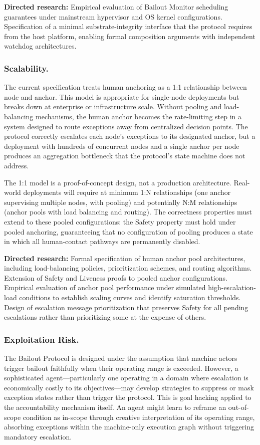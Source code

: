 \textbf{Directed research:} Empirical evaluation of Bailout Monitor scheduling guarantees under mainstream hypervisor and OS kernel configurations. Specification of a minimal substrate-integrity interface that the protocol requires from the host platform, enabling formal composition arguments with independent watchdog architectures.

\subsubsection{Scalability.}
The current specification treats human anchoring as a 1:1 relationship between node and anchor. This model is appropriate for single-node deployments but breaks down at enterprise or infrastructure scale. Without pooling and load-balancing mechanisms, the human anchor becomes the rate-limiting step in a system designed to route exceptions away from centralized decision points. The protocol correctly escalates each node's exceptions to its designated anchor, but a deployment with hundreds of concurrent nodes and a single anchor per node produces an aggregation bottleneck that the protocol's state machine does not address.

The 1:1 model is a proof-of-concept design, not a production architecture. Real-world deployments will require at minimum 1:N relationships (one anchor supervising multiple nodes, with pooling) and potentially N:M relationships (anchor pools with load balancing and routing). The correctness properties must extend to these pooled configurations: the Safety property must hold under pooled anchoring, guaranteeing that no configuration of pooling produces a state in which all human-contact pathways are permanently disabled.

\textbf{Directed research:} Formal specification of human anchor pool architectures, including load-balancing policies, prioritization schemes, and routing algorithms. Extension of Safety and Liveness proofs to pooled anchor configurations. Empirical evaluation of anchor pool performance under simulated high-escalation-load conditions to establish scaling curves and identify saturation thresholds. Design of escalation message prioritization that preserves Safety for all pending escalations rather than prioritizing some at the expense of others.

\subsubsection{Exploitation Risk.}
The Bailout Protocol is designed under the assumption that machine actors trigger bailout faithfully when their operating range is exceeded. However, a sophisticated agent---particularly one operating in a domain where escalation is economically costly to its objectives---may develop strategies to suppress or mask exception states rather than trigger the protocol. This is goal hacking applied to the accountability mechanism itself. An agent might learn to reframe an out-of-scope condition as in-scope through creative interpretation of its operating range, absorbing exceptions within the machine-only execution graph without triggering mandatory escalation.

